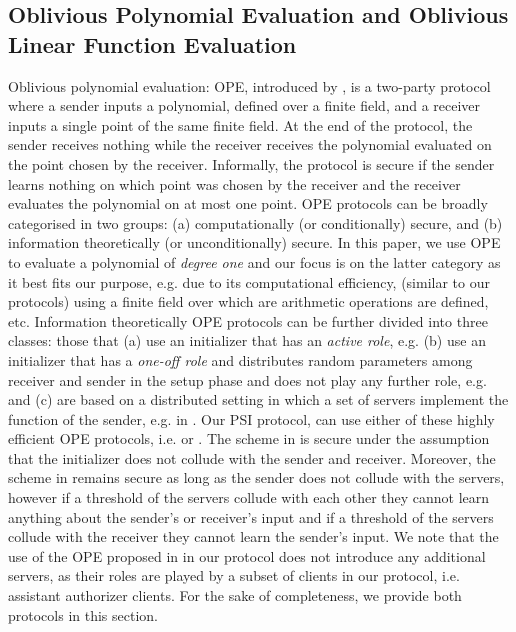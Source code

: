 \subsection{Oblivious Polynomial Evaluation and Oblivious Linear Function Evaluation} Oblivious polynomial evaluation: OPE, introduced by \cite{Naor:1999:OTP}, is a two-party protocol where a sender  inputs a polynomial, defined over a finite field, and a receiver inputs a single
point of the same finite field. At the end of the protocol, the sender receives nothing while the receiver  receives the polynomial evaluated on the point chosen by the receiver. Informally, the protocol is secure if the sender learns nothing on which point was chosen by the receiver and the receiver evaluates the polynomial on at most one point. OPE protocols can be broadly categorised in two groups: (a) computationally (or conditionally) secure, and (b) information theoretically (or unconditionally) secure. In this paper, we use OPE to evaluate a polynomial of \emph{degree one} and our focus is on the latter category as it best fits our purpose, e.g. due to its computational efficiency, (similar to our protocols) using a finite field over which are arithmetic operations are defined, etc. Information  theoretically OPE protocols can be further divided into three  classes: those that  (a) use an initializer that has an \emph{active role}, e.g. \cite{DBLP:conf/asiacrypt/ChangL01} (b) use an initializer that has a \emph{one-off role} and distributes  random parameters among receiver and sender in the setup phase and does not play any further role, e.g. \cite{DBLP:conf/acisp/HanaokaIMNOW04} and (c) are based on a distributed setting in which a set of servers implement the function of the sender, e.g. in \cite{DBLP:conf/icisc/CianciulloG18}. Our PSI protocol, can use either of these highly efficient OPE protocols, i.e.  \cite{DBLP:conf/acisp/HanaokaIMNOW04} or \cite{DBLP:conf/icisc/CianciulloG18}.  The scheme in \cite{DBLP:conf/acisp/HanaokaIMNOW04} is secure under the assumption that the initializer does not collude with the sender and receiver. Moreover, the scheme in \cite{DBLP:conf/icisc/CianciulloG18} remains secure as long as the sender does not collude with the servers, however if a threshold of the servers  collude with each other they cannot learn anything about the sender's or receiver's input and if a threshold of the servers collude with the receiver they cannot learn the sender's input. We note that the  use of the  OPE proposed in \cite{DBLP:conf/icisc/CianciulloG18}  in our protocol does not introduce any  additional servers, as  their roles are played by a subset of  clients in our protocol, i.e. assistant authorizer clients. For the sake of completeness, we provide both protocols \cite{DBLP:conf/acisp/HanaokaIMNOW04} in this section. 

